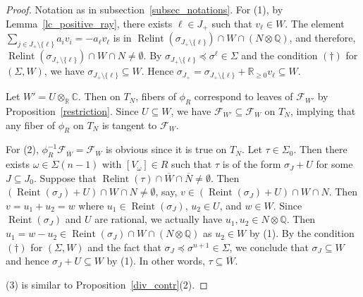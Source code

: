 \documentclass[12pt,reqno]{amsart}
\theoremstyle{definition}
\newcommand{\mc}{\mathcal}
\newcommand{\mb}{\mathbb}
\newcommand{\on}{\operatorname}
\newcommand\cF{{\mathcal{F}}}
\newcommand\bQ{{\mathbb Q}}
\begin{document}
\begin{proof}
    Notation as in subsection~\ref{subsec_notations}. 
    For (1), by Lemma~\ref{lc_positive_ray}, there exists $\ell\in J_+$ such that $v_\ell\in W$.
    The element $\sum_{j\in J_+\setminus\{\ell\}}a_iv_i = -a_{\ell}v_{\ell}$ is in $\on{Relint}(\sigma_{J_+\setminus\{\ell\}})\cap W\cap (N\otimes\bQ)$, and therefore, $\on{Relint}(\sigma_{J_+\setminus\{\ell\}})\cap W\cap N\neq\emptyset$.
    By $\sigma_{J_+\setminus\{\ell\}}\preceq \sigma^\ell\in\Sigma$ and the condition $(\dagger)$ for $(\Sigma,W)$, we have $\sigma_{J_+\setminus\{\ell\}}\subseteq W$. Hence $\sigma_{J_+}=\sigma_{J_+\setminus\{\ell\}}+\mb R_{\geq 0}v_\ell\subseteq W$.
    
    Let $W'=U\otimes_\mb R\mb C$. Then on $T_N$, fibers of $\phi_R$ correspond to leaves of $\mc F_{W'}$ by Proposition~\ref{restriction}. Since $U\subseteq W$, we have $\mc F_{W'}\subseteq \mc F_W$ on $T_N$, implying that any fiber of $\phi_R$ on $T_N$ is tangent to $\mc F_W$.        
    
    For (2), $\phi_R^{-1}\cF_{\overline{W}}=\mc F_W$ is obvious since it is true on $T_N$.
    Let $\tau\in\Sigma_0$. Then there exists $\omega\in\Sigma(n-1)$ with $[V_\omega]\in R$ such that $\tau$ is of the form $\sigma_J+U$ for some $J\subseteq J_0$.
    Suppose that $\on{Relint}(\tau)\cap\overline{W}\cap\overline{N}\neq\emptyset$. Then $(\on{Reint}(\sigma_J)+U)\cap W\cap N\neq\emptyset$, say, $v\in(\on{Reint}(\sigma_J)+U)\cap W\cap N$. Then $v=u_1+u_2=w$ where $u_1\in\on{Reint}(\sigma_J)$, $u_2\in U$, and $w\in W$. Since $\on{Reint}(\sigma_J)$ and $U$ are rational, we actually have $u_1,u_2\in N\otimes\bQ$. Then $u_1=w-u_2\in\on{Reint}(\sigma_J)\cap W\cap (N\otimes\bQ)$ as $u_2\in W$ by (1). By the condition $(\dagger)$ for $(\Sigma,W)$ and the fact that $\sigma_{J}\preceq\sigma^{n+1}\in\Sigma$, we conclude that $\sigma_J\subseteq W$ and hence $\sigma_J+U\subseteq W$ by (1). In other words, $\tau\subseteq\overline{W}$.     
    
    (3) is similar to Proposition~\ref{div_contr}(2). 
\end{proof}
\end{document}
